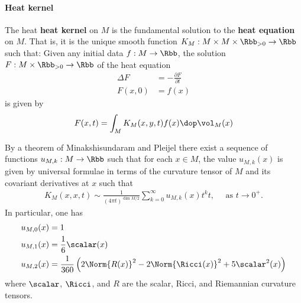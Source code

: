\paragraph{Heat kernel}
The heat \textbf{heat kernel} on $M$ is the fundamental solution to the \textbf{heat equation} on $M$. That is,  it is the unique smooth function $K_M:M\times M \times \Rbb_{>0} \to \Rbb$ such that:  Given any initial data $f: M \to \Rbb$, the solution $F:M\times \Rbb_{>0} \to \Rbb$ of the heat equation
\begin{align}
  \Delta F & = - \frac{\partial F}{\partial t} \\
  F(x,0)   & = f(x)
\end{align}
is given by
\begin{align}
  F(x,t) = \int_M K_M(x,y,t)f(x) \dop \vol_M(x)
\end{align}


By a theorem of Minakshisundaram and Pleijel \cite{Minakshisundaram.Pleijel-[PropertiesEigenfunctionsLaplaceoperator]1949} there exist a sequence of functions $u_{M,k} : M \to \Rbb$ such that for each $x \in M$, the value $u_{M,k}(x)$ is given by universal formulae in terms of the curvature tensor of $M$ and its covariant derivatives at $x$ such that
\begin{align}\label{eq:heatAsymptoticM}
  K_M(x,x,t) \sim \frac{1}{(4\pi t)^{\dim M /2 }} \sum_{k=0}^\infty u_{M,k}(x)t^k t, \quad \text{ as $t\to 0^+$.}
\end{align}
In particular, \cite[page 398]{Berger-[PanoramicViewRiemannian]2003} one has
\begin{align}
  u_{M,0} (x) & = 1                            \label{eq:heatzero}                                                     \\
  u_{M,1}(x)  & = \frac{1}{6} \label{eq:heatone}\scalar(x)                                                             \\
  u_{M,2}(x)  & = \frac{1}{360} \left( 2\Norm{R(x)}^2 -2 \Norm{\Ricci(x)}^2 +5 \scalar^2(x) \right) \label{eq:heattwo}
\end{align}
where $\scalar$, $\Ricci$, and $R$ are the scalar, Ricci, and Riemannian curvature tensors.

